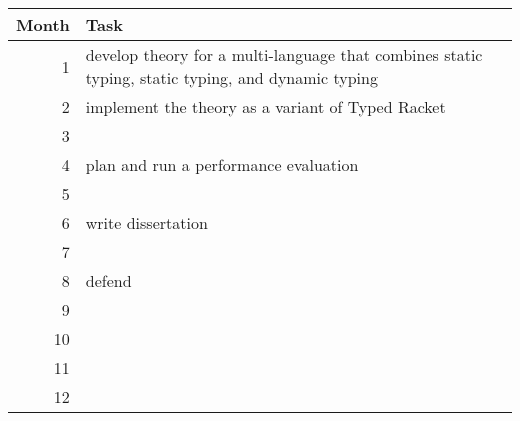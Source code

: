\begin{tabular}{rl}
  Month & Task \\\hline
  1     & develop theory for a multi-language that combines \tdeep{} static typing, \tshallow{} static typing, and dynamic typing
  \\
  2     & implement the theory as a variant of Typed Racket
  \\
  3     &
  \\
  4     & plan and run a performance evaluation
  \\
  5     &
  \\
  6     & write dissertation
  \\
  7     &
  \\
  8     & defend
  \\
  9     &
  \\
  10    &
  \\
  11    &
  \\
  12    &
\end{tabular}
